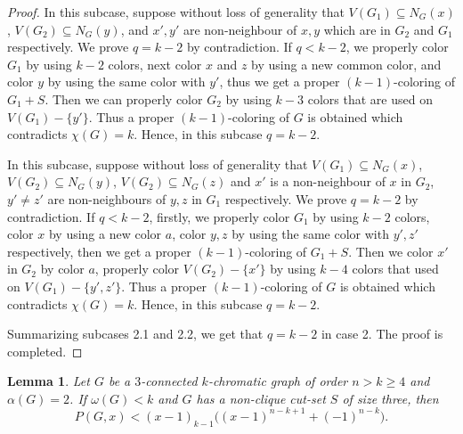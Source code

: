 \documentclass[12pt]{article}
\newtheorem{lemma}[theorem]{Lemma}
\theoremstyle{definition}
\begin{document}
\begin{proof}

In this subcase, suppose without loss of generality that $V(G_1)\subseteq N_{G}(x)$, $V(G_2)\subseteq N_{G}(y)$, and $x',y'$ are non-neighbour of $x, y$ which are in $G_2$ and $G_1$ respectively. We prove $q=k-2$ by contradiction.
If $q<k-2$, we properly color $G_1$ by using $k-2$ colors, next color $x$ and $z$ by using a new common color, and color $y$ by using the same color with $y'$, thus we get a proper $(k-1)$-coloring of $G_1+S$. Then we can properly color $G_2$ by using $k-3$ colors that are used on $V(G_1)-\{y'\}$. Thus a proper $(k-1)$-coloring of $G$ is obtained which contradicts $\chi(G)=k$. Hence, in this subcase $q=k-2$.




In this subcase, suppose without loss of generality that $V(G_1)\subseteq N_{G}(x)$, $V(G_2)\subseteq N_{G}(y)$, $V(G_2)\subseteq N_{G}(z)$ and $x'$ is a non-neighbour of $x$ in $G_2$, $y'\neq z'$ are non-neighbours of $y, z$ in $G_1$ respectively. We prove $q=k-2$ by contradiction. If $q<k-2$,
firstly, we properly color $G_1$ by using $k-2$ colors, color $x$ by using a new color $a$, color $y, z$ by using the same color with $y', z'$ respectively, then we get a proper $(k-1)$-coloring of $G_1+S$. Then we color $x'$ in $G_2$ by color $a$, properly color $V(G_2)-\{x'\}$ by using
$k-4$ colors that used on $V(G_1)-\{y', z'\}$. Thus a proper $(k-1)$-coloring of $G$ is obtained which contradicts $\chi(G)=k$. Hence, in this subcase $q=k-2$.

Summarizing subcases 2.1 and 2.2, we get that $q=k-2$ in case 2. The proof is completed.
\end{proof}

\begin{lemma}\label{Min22} Let $G$  be a $3$-connected $k$-chromatic graph of order $n>k\geq 4$ and $\alpha(G)=2$. If $\omega(G)<k$ and $G$ has a non-clique cut-set $S$ of size three, then $$P(G,x)<(x-1)_{k-1}\big((x-1)^{n-k+1}+(-1)^{n-k}\big).$$
\end{lemma}
\end{document}
